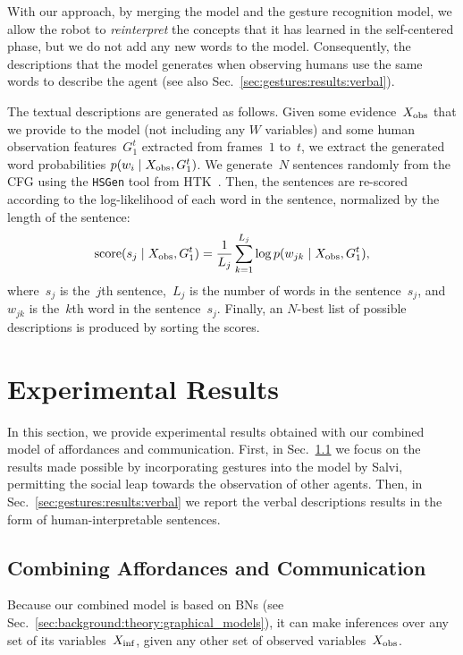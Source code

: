 With our approach, by merging the \AffWords{} model and the gesture recognition model, we allow the robot to \emph{reinterpret} the concepts that it has learned in the self-centered phase, but we do not add any new words to the model.
Consequently, the descriptions that the model generates when observing humans use the same words to describe the agent (see also Sec.~\ref{sec:gestures:results:verbal}).

The textual descriptions are generated as follows.
Given some evidence~$X_\text{obs}$ that we provide to the model (not including any $W$ variables) and some human observation features~$G_1^t$ extracted from frames~$1$ to~$t$, we extract the generated word probabilities
$p(w_i \mid X_\text{obs}, G_1^t)$.
We generate~$N$ sentences randomly from the \ac{CFG} using the \texttt{HSGen} tool from HTK~\cite{young:htkbook}.
Then, the sentences are re-scored according to the log-likelihood of each word in the sentence, normalized by the length of the sentence:
\begin{equation} \label{eq:sentence_score}
  \text{score}(s_j \mid X_\text{obs}, G_1^t) = \frac{1}{L_j} \sum_{k=1}^{L_j} \log p(w_{jk} \mid X_\text{obs}, G_1^t),
\end{equation}
where~$s_j$ is the~$j$th sentence,~$L_j$ is the number of words in the sentence~$s_j$, and~$w_{jk}$ is the~$k$th word in the sentence~$s_j$.
Finally, an $N$-best list of possible descriptions is produced by sorting the scores.

\section{Experimental Results}
\label{sec:gestures:results}

In this section, we provide experimental results obtained with our combined model of affordances and communication.
First, in Sec.~\ref{sec:gestures:results:affgest} we focus on the results made possible by incorporating gestures into the \AffWords{} model by Salvi, permitting the social leap towards the observation of other agents.
Then, in Sec.~\ref{sec:gestures:results:verbal} we report the verbal descriptions results in the form of human-interpretable sentences.

\subsection{Combining Affordances and Communication}
\label{sec:gestures:results:affgest}

Because our combined model is based on \aclp{BN} (see Sec.~\ref{sec:background:theory:graphical_models}), it can make inferences over any set of its variables~$X_\text{inf}$, given any other set of observed variables~$X_\text{obs}$.

